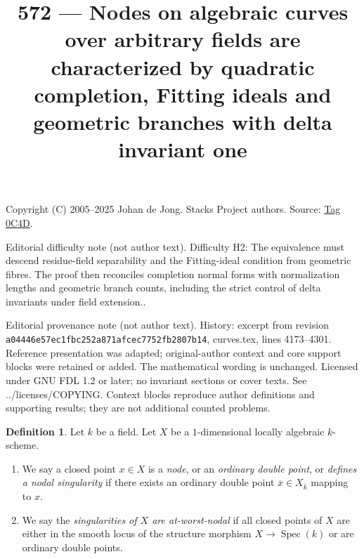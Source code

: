 \documentclass{amsart}
\theoremstyle{plain}
\theoremstyle{definition}
\newtheorem{definition}[subsection]{Definition}
\theoremstyle{remark}
\numberwithin{equation}{subsection}
\def\Spec{\mathop{\mathrm{Spec}}}
\begin{document}
\title[Stacks Project, Tag 0C4D]{572 --- Nodes on algebraic curves over arbitrary fields are characterized by quadratic completion, Fitting ideals and geometric branches with delta invariant one}
\maketitle
\noindent Copyright (C) 2005--2025 Johan de Jong. Stacks Project authors. Source: \href{https://stacks.math.columbia.edu/tag/0C4D}{Tag 0C4D}.

\noindent Editorial difficulty note (not author text). Difficulty H2: The equivalence must descend residue-field separability and the Fitting-ideal condition from geometric fibres. The proof then reconciles completion normal forms with normalization lengths and geometric branch counts, including the strict control of delta invariants under field extension..

\noindent Editorial provenance note (not author text). History: excerpt from revision \texttt{a0444\allowbreak 6e57e\allowbreak c1fbc\allowbreak 252a8\allowbreak 71afc\allowbreak ec775\allowbreak 2fb28\allowbreak 07b14}, curves.tex, lines 4173--4301. Reference presentation was adapted; original-author context and core support blocks were retained or added. The mathematical wording is unchanged. Licensed under GNU FDL 1.2 or later; no invariant sections or cover texts. See ../licenses/COPYING. Context blocks reproduce author definitions and supporting results; they are not additional counted problems.

\begin{definition}
\label{definition-nodal}
Let $k$ be a field. Let $X$ be a $1$-dimensional locally algebraic $k$-scheme.
\begin{enumerate}
\item We say a closed point $x \in X$ is a {\it node}, or an
{\it ordinary double point}, or {\it defines a nodal singularity}
if there exists an ordinary double point $\overline{x} \in X_{\overline{k}}$
mapping to $x$.
\item We say the {\it singularities of $X$ are at-worst-nodal} if
all closed points of $X$ are either in the smooth locus of
the structure morphism $X \to \Spec(k)$ or are ordinary double points.
\end{enumerate}
\end{definition}
\end{document}
